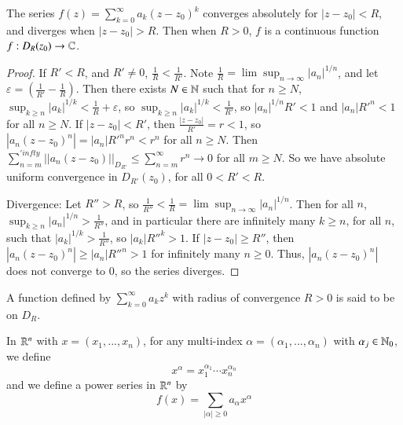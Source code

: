 \begin{proposition}\label{prop:3.3.3}
    The series $f(z) = \sum_{k=0}^{\infty}a_k(z-z_0)^k$ converges absolutely for $|z-z_0| < R$, and diverges when $|z-z_0| > R$. Then when $R > 0$, $f$ is a continuous function $f:D_R(z_0) \rightarrow \mathbb C$.
\end{proposition}
\begin{proof}
    If $R' < R$, and $R' \neq 0$, $\frac{1}{R} < \frac{1}{R'}$. Note $\frac{1}{R} = \lim\sup_{n\rightarrow \infty}|a_n|^{1/n}$, and let $\varepsilon = \left(\frac{1}{R'} - \frac{1}{R}\right)$. Then there exists $N \in \mathbb N$ such that for $n \geq N$, $\sup_{k\geq n}|a_k|^{1/k} < \frac{1}{R}+\varepsilon$, so $\sup_{k\geq n}|a_k|^{1/k} < \frac{1}{R'}$, so $|a_n|^{1/n}R' < 1$ and $|a_n|{R'}^n < 1$ for all $n \geq N$. If $|z-z_0| < R'$, then $\frac{|z-z_0|}{R'} = r < 1$, so $|a_n(z-z_0)^n| = |a_n|{R'}^nr^n < r^n$ for all $n \geq N$. Then $\sum_{n=m}^{'infty}||a_n(z-z_0)||_{D_{R'}} \leq \sum_{n=m}^{\infty}r^n\rightarrow 0$ for all $m \geq N$. So we have absolute uniform convergence in $D_{R'}(z_0)$, for all $0 < R' < R$.

    Divergence: Let $R'' > R$, so $\frac{1}{R''} < \frac{1}{R} = \lim\sup_{n\rightarrow \infty}|a_n|^{1/n}$. Then for all $n$, $\sup_{k\geq n}|a_n|^{1/n} > \frac{1}{R''}$, and in particular there are infinitely many $k \geq n$, for all $n$, such that $|a_k|^{1/k} > \frac{1}{R''}$, so $|a_k|{R''}^k > 1$. If $|z-z_0| \geq R''$, then $|a_n(z-z_0)^n| \geq |a_n|{R''}^n > 1$ for infinitely many $n \geq 0$. Thus, $|a_n(z-z_0)^n|$ does not converge to $0$, so the series diverges.
\end{proof}

\begin{definition}
    A function defined by $\sum_{k=0}^{\infty}a_kz^k$ with radius of convergence $R > 0$ is said to be  on $D_R$.
\end{definition}

\begin{definition}
    In $\mathbb R^n$ with $x = (x_1,...,x_n)$, for any multi-index $\alpha = (\alpha_1,...,\alpha_n)$ with $\alpha_j \in \mathbb N_0$, we define \begin{equation*}
        x^{\alpha} = x_1^{\alpha_1}\cdots x_n^{\alpha_n}
    \end{equation*}
    and we define a power series in $\mathbb R^n$ by \begin{equation*}
        f(x) = \sum_{|\alpha| \geq 0}a_{\alpha}x^{\alpha}
    \end{equation*}
\end{definition}


